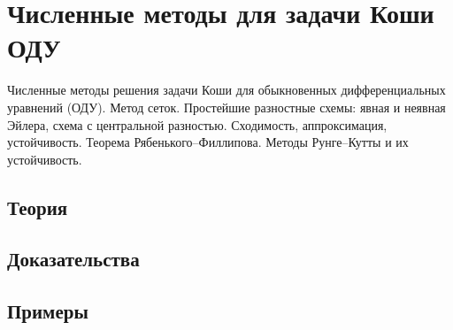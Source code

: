 
\section{Численные методы для задачи Коши ОДУ}
\label{sec:2.1.11-ode-cauchy}

\begin{ticket}
Численные методы решения задачи Коши для обыкновенных дифференциальных уравнений (ОДУ). Метод сеток. Простейшие разностные схемы: явная и неявная Эйлера, схема с центральной разностью. Сходимость, аппроксимация, устойчивость. Теорема Рябенького–Филлипова. Методы Рунге–Кутты и их устойчивость.
\end{ticket}

\subsection*{Теория}

\subsection*{Доказательства}

\subsection*{Примеры}

